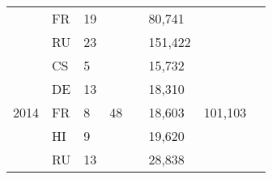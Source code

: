 \documentclass[paper=a4, fontsize=11pt]{scrartcl}
\numberwithin{equation}{section}		%
\numberwithin{figure}{section}			%
\numberwithin{table}{section}				%
\begin{document}
\begin{table}[htbp]
{\begin{tabular}{l|l|l|l|l|l|l|l|}
\multicolumn{1}{|l|}{}                      & FR                                    & 19                              &                     &                       & 80,741                        &                          &                           \\ \cline{2-3} \cline{6-6}
\multicolumn{1}{|l|}{}                      & RU                                    & 23                              &                     &                       & 151,422                       &                          &                           \\ \cline{1-4} \cline{6-7}
\multicolumn{1}{|l|}{\multirow{5}{*}{2014}} & CS                                    & 5                               & \multirow{5}{*}{48} &                       & 15,732                        & \multirow{5}{*}{101,103} &                           \\ \cline{2-3} \cline{6-6}
\multicolumn{1}{|l|}{}                      & DE                                    & 13                              &                     &                       & 18,310                        &                          &                           \\ \cline{2-3} \cline{6-6}
\multicolumn{1}{|l|}{}                      & FR                                    & 8                               &                     &                       & 18,603                        &                          &                           \\ \cline{2-3} \cline{6-6}
\multicolumn{1}{|l|}{}                      & HI                                    & 9                               &                     &                       & 19,620                        &                          &                           \\ \cline{2-3} \cline{6-6}
\multicolumn{1}{|l|}{}                      & RU                                    & 13                              &                     &                       & 28,838                        &                          &                           \\ \hline
\end{tabular}}
\end{table}
\end{document}
